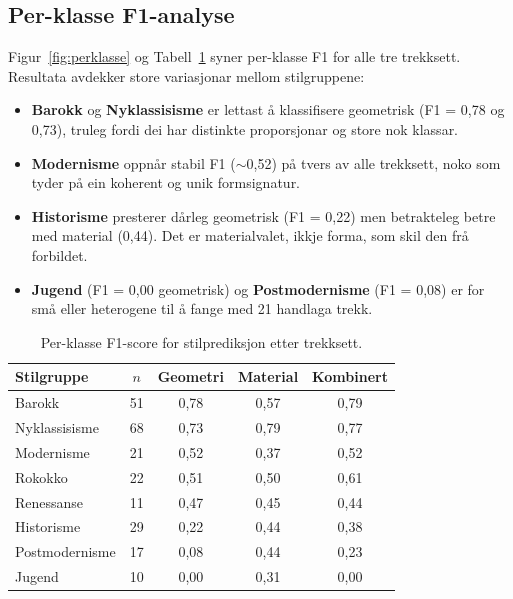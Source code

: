\documentclass[12pt,a4paper]{article}
\begin{document}
\subsection{Per-klasse F1-analyse}

Figur~\ref{fig:perklasse} og Tabell~\ref{tab:perklasse} syner per-klasse F1 for alle tre trekksett. Resultata avdekker store variasjonar mellom stilgruppene:

\begin{itemize}
    \item \textbf{Barokk} og \textbf{Nyklassisisme} er lettast \aa{} klassifisere geometrisk (F1 = 0{,}78 og 0{,}73), truleg fordi dei har distinkte proporsjonar og store nok klassar.
    \item \textbf{Modernisme} oppn\aa{}r stabil F1 ($\sim$0{,}52) p\aa{} tvers av alle trekksett, noko som tyder p\aa{} ein koherent og unik formsignatur.
    \item \textbf{Historisme} presterer d\aa{}rleg geometrisk (F1 = 0{,}22) men betrakteleg betre med material (0{,}44). Det er materialvalet, ikkje forma, som skil den fr\aa{} forbildet.
    \item \textbf{Jugend} (F1 = 0{,}00 geometrisk) og \textbf{Postmodernisme} (F1 = 0{,}08) er for sm\aa{} eller heterogene til \aa{} fange med 21 handlaga trekk.
\end{itemize}

\begin{table}[H]
\centering
\caption{Per-klasse F1-score for stilprediksjon etter trekksett.}
\label{tab:perklasse}
\begin{tabular}{lcccc}
\toprule
Stilgruppe & $n$ & Geometri & Material & Kombinert \\
\midrule
Barokk          & 51 & 0{,}78 & 0{,}57 & 0{,}79 \\
Nyklassisisme   & 68 & 0{,}73 & 0{,}79 & 0{,}77 \\
Modernisme      & 21 & 0{,}52 & 0{,}37 & 0{,}52 \\
Rokokko         & 22 & 0{,}51 & 0{,}50 & 0{,}61 \\
Renessanse      & 11 & 0{,}47 & 0{,}45 & 0{,}44 \\
Historisme      & 29 & 0{,}22 & 0{,}44 & 0{,}38 \\
Postmodernisme  & 17 & 0{,}08 & 0{,}44 & 0{,}23 \\
Jugend          & 10 & 0{,}00 & 0{,}31 & 0{,}00 \\
\bottomrule
\end{tabular}
\end{table}
\end{document}

